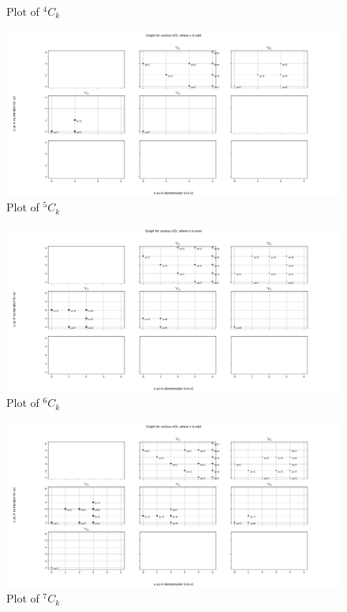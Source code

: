 \documentclass[10pt, twoside]{article}
\newcommand*{\Combination}[2]{{}^{#1}C_{#2}}%
\begin{document}
\begin{appendices}
\begin{figure}[ph!]
	\caption{Plot of $\Combination{4}{k}$}
	\label{4Ck}
\end{figure}
\begin{figure}[ph!]	
	\includegraphics[width=\linewidth]{5Ck.png}
	\caption{Plot of $\Combination{5}{k}$}
	\label{5Ck}
\end{figure}
\begin{figure}[ph!]	
	\includegraphics[width=\linewidth]{6Ck.png}
	\caption{Plot of $\Combination{6}{k}$}
	\label{6Ck}
\end{figure}
\begin{figure}[ph!]	
	\includegraphics[width=\linewidth]{7Ck.png}
	\caption{Plot of $\Combination{7}{k}$}

\end{figure}
\end{appendices}
\end{document}
